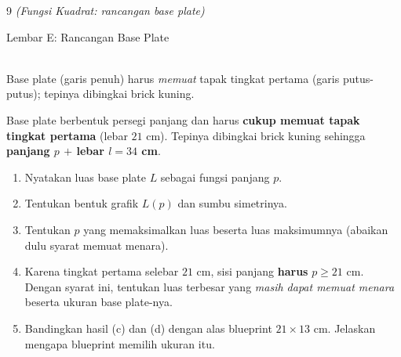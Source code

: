 \documentclass[11pt]{article}
\newenvironment{subsoal}{%
  \begin{enumerate}[label=\textbf{(\alph*)},leftmargin=1.8em,itemsep=5pt,topsep=3pt]}%
  {\end{enumerate}}
\begin{document}
\begin{soal}{9 \normalfont\itshape(Fungsi Kuadrat: rancangan base plate)}
\begin{lembar}{Lembar E: Rancangan Base Plate}
\centering
{}\\[2pt]
{\small Base plate (garis penuh) harus \emph{memuat} tapak tingkat pertama (garis
putus-putus); tepinya dibingkai brick kuning.}
\end{lembar}

\smallskip
Base plate berbentuk persegi panjang dan harus \textbf{cukup memuat tapak tingkat
pertama} (lebar $21$ cm). Tepinya dibingkai brick kuning sehingga
\textbf{panjang $p$ $+$ lebar $l = 34$ cm}.

\begin{subsoal}
  \item Nyatakan luas base plate $L$ sebagai fungsi panjang $p$.
  \item Tentukan bentuk grafik $L(p)$ dan sumbu simetrinya.
  \item Tentukan $p$ yang memaksimalkan luas beserta luas maksimumnya (abaikan
        dulu syarat memuat menara).
  \item Karena tingkat pertama selebar $21$ cm, sisi panjang \textbf{harus}
        $p\ge21$ cm. Dengan syarat ini, tentukan luas terbesar yang \emph{masih
        dapat memuat menara} beserta ukuran base plate-nya.
  \item Bandingkan hasil (c) dan (d) dengan alas blueprint $21\times13$ cm.
        Jelaskan mengapa blueprint memilih ukuran itu.
\end{subsoal}
\end{soal}
\end{document}
